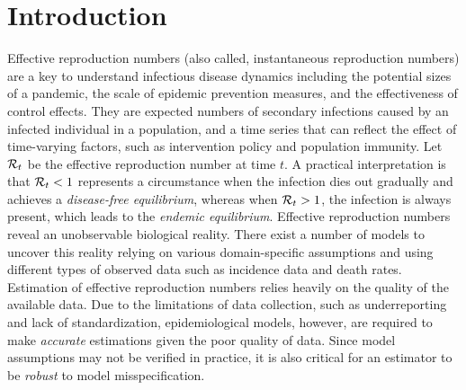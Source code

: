 \section{Introduction}
\label{sec:intro}

Effective reproduction numbers (also called, instantaneous reproduction numbers) are a key to understand infectious disease dynamics including the potential sizes of a pandemic, the scale of epidemic prevention measures, and the effectiveness of control effects. 
They are expected numbers of secondary infections caused by an infected individual in a population, and a time series that can reflect the effect of time-varying factors, such as intervention policy and population immunity. 
Let $\mathcal{R}_t$ be the effective reproduction number at time $t$. A practical interpretation is that $\mathcal{R}_t < 1$ represents a circumstance when the infection dies out gradually and achieves a \textit{disease-free equilibrium}, whereas when $\mathcal{R}_t > 1$, the infection is always present, which leads to the \textit{endemic equilibrium}. 
%
Effective reproduction numbers reveal an unobservable biological reality. 
There exist a number of models to uncover this reality relying on various domain-specific assumptions and using different types of observed data such as incidence data and death rates. 
Estimation of effective reproduction numbers relies heavily on the quality of the available data. Due to the limitations of data collection, such as underreporting and lack of standardization, epidemiological models, however, are required to make \textit{accurate} estimations given the poor quality of data. Since model assumptions may not be verified in practice, it is also critical for an estimator to be \textit{robust} to model misspecification. 

